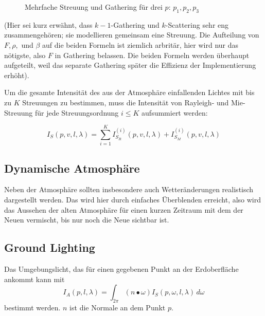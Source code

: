 \begin{figure}
	\caption{Mehrfache Streuung und Gathering für drei $p$: $p_1, p_2, p_3$}
	\label{MS-image}
\end{figure}

(Hier sei kurz erwähnt, dass $k-1$-Gathering und $k$-Scattering sehr eng zusammengehören; sie modellieren gemeinsam eine
Streuung. Die Aufteilung von $F,\rho,$ und $\beta$ auf die beiden Formeln ist ziemlich arbritär, hier wird nur das
nötigste, also $F$ in Gathering belassen. Die beiden Formeln werden überhaupt aufgeteilt, weil das separate Gathering
später die Effizienz der Implementierung erhöht).

Um die gesamte Intensität des aus der Atmosphäre einfallenden Lichtes mit bis zu $K$ Streuungen zu bestimmen, muss die
Intensität von Rayleigh- und Mie-Streuung für jede Streuungsordnung $i \le K$ aufsummiert werden:

\begin{equation} \label{eq:insc_total}
	I_S(p,v,l,\lambda) = \sum^{K}_{i=1} I^{(i)}_{S_R}(p, v, l, \lambda) + I^{(i)}_{S_M}(p, v, l, \lambda) 
\end{equation}

\subsection{Dynamische Atmosphäre}
Neben der Atmosphäre sollten insbesondere auch Wetteränderungen realistisch dargestellt werden. Das wird hier durch
einfaches Überblenden erreicht, also wird das Aussehen der alten Atmosphäre für einen kurzen Zeitraum mit dem der Neuen
vermischt, bis nur noch die Neue sichtbar ist.

\subsection{Ground Lighting}
Das Umgebungslicht, das für einen gegebenen Punkt an der Erdoberfläche ankommt kann mit
\begin{equation} \label{eq:gl}
	I_A(p,l,\lambda) = \int_{2\pi}^{} (n \bullet \omega)I_S(p, \omega, l, \lambda) \,d\omega
\end{equation}
bestimmt werden. $n$ ist die Normale an dem Punkt $p$.

